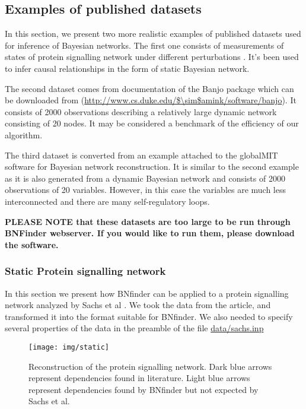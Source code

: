 \subsection{Examples of published  datasets}
\label{sec:real}

In this section, we present two more realistic examples of published
datasets used for inference of Bayesian networks. The first one
consists of measurements of states of protein signalling network under
different perturbations \cite{pmid15845847}. It's been used to infer
causal relationships in the form of static Bayesian network.

The second dataset comes from documentation of the Banjo package
\cite{Smith2006} which can be downloaded from
(\url{http://www.cs.duke.edu/$\sim$amink/software/banjo}). It consists
of 2000 observations describing a relatively large dynamic network
consisting of 20 nodes. It may be considered a benchmark of the
efficiency of our algorithm.

The third dataset is converted from an example attached to the
globalMIT software for Bayesian network reconstruction. It is similar
to the second example as it is also generated from a dynamic Bayesian
network and consists of 2000 observations of 20 variables. However, in
this case the variables are much less interconnected and there are
many self-regulatory loops.

\textbf{PLEASE NOTE that these datasets are too large to be run through BNFinder webserver. If you would like to run them, please download the software. }

\subsubsection{Static Protein signalling network}
\label{sec:realStat}

In this section we present how BNfinder can be applied to a protein
signalling network analyzed by Sachs et al \cite{pmid15845847}. We
took the data from the article, and transformed it into the format
suitable for BNfinder. We also needed to specify several properties of
the data in the preamble of the file \url{data/sachs.inp}

\begin{figure}[h]
  \centering
  \texttt{[image: img/static]}  
  \caption{Reconstruction of the protein signalling network. Dark blue
    arrows represent dependencies found in literature. Light blue
    arrows represent dependencies found by BNfinder but not expected
    by Sachs et al. \cite{pmid15845847}}
  \label{fig:stat}
\end{figure}

